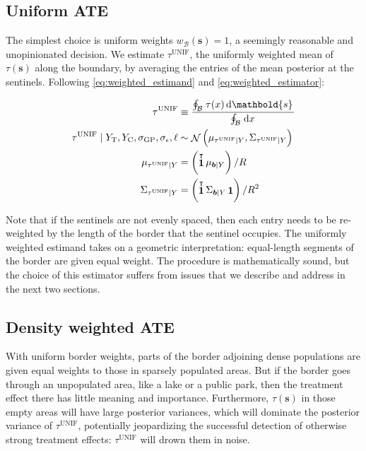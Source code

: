 \documentclass[letter]{article}
\DeclareMathOperator{\normal}{\mathcal{N}}
\DeclareMathOperator{\ones}{\mathbf{1}}
\newcommand{\trans}{^{\intercal}}
\newcommand{\treat}{\mathrm{T}}
\newcommand{\ctrol}{\mathrm{C}}
\newcommand{\sigmaf}{\sigma_{\mathrm{GP}}}
\newcommand{\sigman}{\sigma_{\epsilon}}
\newcommand{\svec}{\mathbold{s}}
\newcommand{\boundary}{\mathcal{B}}
\newcommand{\sentinels}{\bm{b}}
\newcommand{\unifavg}{\tau^{\mathrm{UNIF}}}
\newcommand{\eqlabel}[1]{\label{#1}}
\newcommand{\numsent}{R}
\newcommand{\weightb}{w_{\boundary}}
\begin{document}
    	\subsection{Uniform ATE}\label{uniform-ate}

The simplest choice is uniform weights \(\weightb(\svec)=1\), a seemingly reasonable and unopinionated decision.
We estimate \(\unifavg\), the uniformly weighted mean of \(\tau(\svec)\) along the boundary, by averaging the entries of the mean posterior at the sentinels.
Following \eqref{eq:weighted_estimand} and \eqref{eq:weighted_estimator}:

\begin{equation}\begin{split}
    \unifavg &\equiv \frac{\oint_\boundary \left. \tau(x) \dif \svec \right.}
                          {\oint_\boundary \left. \dif x \right.} \\
    \unifavg \mid Y_\treat{}, Y_\ctrol{}, \sigmaf, \sigman, \ell &\sim \normal\del{\mu_{\unifavg \mid Y}, \Sigma_{\unifavg \mid Y}} \\
    \mu_{\unifavg \mid Y} &= \del{\ones\trans \mu_{\sentinels \mid Y}} / \numsent \\
    \Sigma_{\unifavg \mid Y} &= \del{\ones\trans \Sigma_{\sentinels \mid Y} \ones} / \numsent^2
\end{split}
\eqlabel{eq:unifavg}
\end{equation}

Note that if the sentinels are not evenly spaced, then each entry needs to be re-weighted by the length of the border that the sentinel occupies.
The uniformly weighted estimand takes on a geometric interpretation: equal-length segments of the border are given equal weight.
The procedure is mathematically sound, but the choice of this estimator suffers from issues that we describe and address in the next two sections.
    


    	\subsection{Density weighted ATE}\label{density-weighted-ate}

With uniform border weights, parts of the border adjoining dense populations are given equal weights to those in sparsely populated areas.
But if the border goes through an unpopulated area, like a lake or a public park, then the treatment effect there has little meaning and importance.
Furthermore, \(\tau(\svec)\) in those empty areas will have large posterior variances, which will dominate the posterior variance of \(\unifavg\), potentially jeopardizing the successful detection of otherwise strong treatment effects: \(\unifavg\) will drown them in noise.
\end{document}

